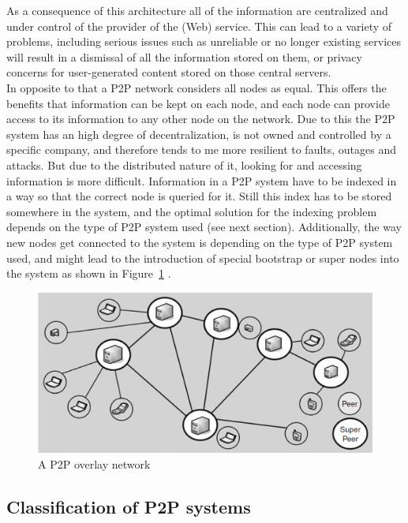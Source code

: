 As a consequence of this architecture all of the information are centralized and under control of the provider of the (Web) service. This can lead to a variety of problems, including serious issues such as unreliable or no longer existing services will result in a dismissal of all the information stored on them, or privacy concerns for user-generated content stored on those central servers. \\

In opposite to that a \gls{P2P} network considers all nodes as equal. This offers the benefits that information can be kept on each node, and each node can provide access to its information to any other node on the network. Due to this the \gls{P2P} system has an high degree of decentralization, is not owned and controlled by a specific company, and therefore tends to me more resilient to faults, outages and attacks. But due to the distributed nature of it, looking for and accessing information is more difficult. Information in a \gls{P2P} system have to be indexed in a way so that the correct node is queried for it. Still this index has to be stored somewhere in the system, and the optimal solution for the indexing problem depends on the type of \gls{P2P} system used (see next section). Additionally, the way new nodes get connected to the system is depending on the type of \gls{P2P} system used, and might lead to the introduction of special bootstrap or super nodes into the system as shown in Figure~\ref{fig:p2p_overlay_network} \citep{parameswaran2001p2p}.

\begin{figure}[H]
	\centering
		\includegraphics[width=0.8\columnwidth]{images/p2p_network.png}
	\caption[A \gls{P2P} overlay network]{A \gls{P2P} overlay network \citep[pg. 9]{buford2009p2p}}
\label{fig:p2p_overlay_network}
\end{figure}


\subsection{Classification of \gls{P2P} systems}
\label{sec:p2p_classification}

